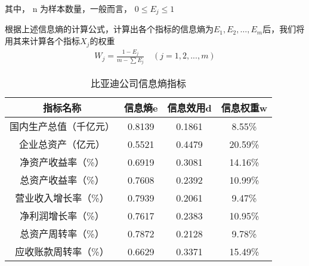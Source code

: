 其中， n 为样本数量，一般而言， $0\leq E_j\leq1$

根据上述信息熵的计算公式，计算出各个指标的信息熵为$E_1,E_2,…,E_m$后，我们将用其来计算各个指标$X_j$的权重
\begin{equation}
\begin{aligned}
W_j=\frac{1-E_j}{m-\sum E_j }\quad (j=1,2,...,m)
  \label{eq:wj}
\end{aligned}
\end{equation}

\begin{table}
  \centering
  \begin{threeparttable}[c]
    \caption{比亚迪公司信息熵指标}
    \label{tab:indicator-hierarchy-result-data}
    \begin{tabular}{cccc}
      \toprule
        指标名称 & 信息熵e & 信息效用d & 信息权重w \\ 
      \midrule
        国内生产总值（千亿元） & 0.8139  & 0.1861  & 8.55\% \\ 
        企业总资产（亿元） & 0.5521  & 0.4479  & 20.59\% \\ 
        净资产收益率（\%） & 0.6919  & 0.3081  & 14.16\% \\ 
        总资产收益率（\%） & 0.7608  & 0.2392  & 10.99\% \\ 
        营业收入增长率（\%） & 0.7939  & 0.2061  & 9.47\% \\ 
        净利润增长率（\%） & 0.7617  & 0.2383  & 10.95\% \\ 
        总资产周转率（\%） & 0.7872  & 0.2128  & 9.78\% \\ 
        应收账款周转率（\%） & 0.6629  & 0.3371  & 15.49\% \\ 
      \bottomrule
    \end{tabular}
  \end{threeparttable}
\end{table}

